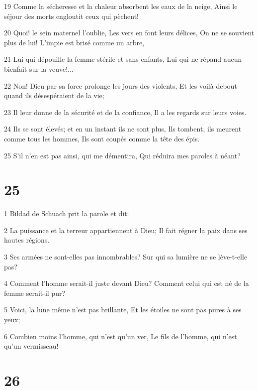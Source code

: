 \par 19 Comme la sécheresse et la chaleur absorbent les eaux de la neige, Ainsi le séjour des morts engloutit ceux qui pèchent!
\par 20 Quoi! le sein maternel l'oublie, Les vers en font leurs délices, On ne se souvient plus de lui! L'impie est brisé comme un arbre,
\par 21 Lui qui dépouille la femme stérile et sans enfants, Lui qui ne répand aucun bienfait sur la veuve!...
\par 22 Non! Dieu par sa force prolonge les jours des violents, Et les voilà debout quand ils désespéraient de la vie;
\par 23 Il leur donne de la sécurité et de la confiance, Il a les regards sur leurs voies.
\par 24 Ils se sont élevés; et en un instant ils ne sont plus, Ils tombent, ils meurent comme tous les hommes, Ils sont coupés comme la tête des épis.
\par 25 S'il n'en est pas ainsi, qui me démentira, Qui réduira mes paroles à néant?

\chapter{25}

\par 1 Bildad de Schuach prit la parole et dit:
\par 2 La puissance et la terreur appartiennent à Dieu; Il fait régner la paix dans ses hautes régions.
\par 3 Ses armées ne sont-elles pas innombrables? Sur qui sa lumière ne se lève-t-elle pas?
\par 4 Comment l'homme serait-il juste devant Dieu? Comment celui qui est né de la femme serait-il pur?
\par 5 Voici, la lune même n'est pas brillante, Et les étoiles ne sont pas pures à ses yeux;
\par 6 Combien moins l'homme, qui n'est qu'un ver, Le fils de l'homme, qui n'est qu'un vermisseau!

\chapter{26}


